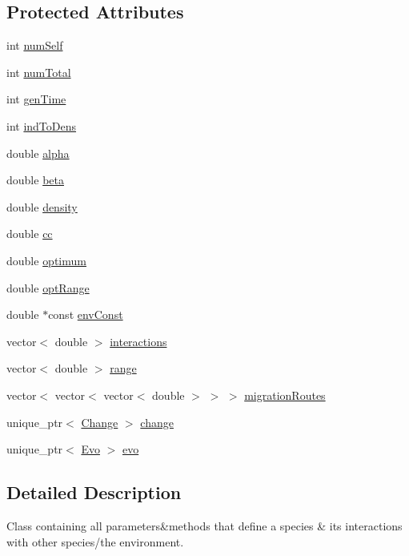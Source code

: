 \subsection*{Protected Attributes}
\begin{DoxyCompactItemize}
\item 
int \hyperlink{classSpecies_a11e7aac3c4a85723e8a9d00d00452508}{num\+Self}
\item 
int \hyperlink{classSpecies_af13ccb1fc01cff22d7a47201c1002fbc}{num\+Total}
\item 
int \hyperlink{classSpecies_a17c9e5d56923d9800bd9b2cfacbcba8b}{gen\+Time}
\item 
int \hyperlink{classSpecies_a3a11f42cb341349dadb706fff06f301d}{ind\+To\+Dens}
\item 
double \hyperlink{classSpecies_a28a22a5a1eef97867bd6e5d7db2c0c6a}{alpha}
\item 
double \hyperlink{classSpecies_ae4f30dc0bf280e80601fc39a0150f8f2}{beta}
\item 
double \hyperlink{classSpecies_a2d5f0b6b799578963257416fa5ad0630}{density}
\item 
double \hyperlink{classSpecies_afbf0d05fd5e3904c1ce62833942ef935}{cc}
\item 
double \hyperlink{classSpecies_a234d375e63c9be61d756b7e70d7d9397}{optimum}
\item 
double \hyperlink{classSpecies_ab7103281892ef74944f3f10df5ecbe69}{opt\+Range}
\item 
double $\ast$const \hyperlink{classSpecies_a95c7dd87e88653b245d52400b4134b68}{env\+Const}
\item 
vector$<$ double $>$ \hyperlink{classSpecies_a2ea9ab3b36448426b237f40dd4a1a18d}{interactions}
\item 
vector$<$ double $>$ \hyperlink{classSpecies_af95c9259381c434919dd4e9041a65bc7}{range}
\item 
vector$<$ vector$<$ vector$<$ double $>$ $>$ $>$ \hyperlink{classSpecies_a732dd85466e7156e8e51c7b44ea00f24}{migration\+Routes}
\item 
unique\+\_\+ptr$<$ \hyperlink{classChange}{Change} $>$ \hyperlink{classSpecies_a6517dbf3b05112b50baadc9479856dda}{change}
\item 
unique\+\_\+ptr$<$ \hyperlink{classEvo}{Evo} $>$ \hyperlink{classSpecies_a25d6cad0391b8d98c986e17bcb5c2586}{evo}
\end{DoxyCompactItemize}


\subsection{Detailed Description}
Class containing all parameters\&methods that define a species \& it\textquotesingle{}s interactions with other species/the environment. 

